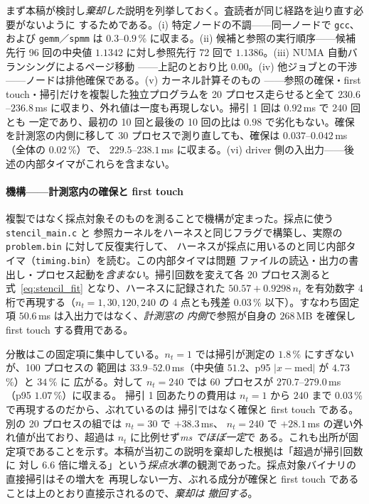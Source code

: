 \documentclass[conference,letterpaper]{IEEEtran}
\begin{document}
まず本稿が検討し\emph{棄却した}説明を列挙しておく。査読者が同じ経路を辿り直す必要がないように
するためである。(i) 特定ノードの不調——同一ノードで \texttt{gcc}、および
\texttt{gemm}／\texttt{spmm} は $0.3$--$0.9$\,\% に収まる。(ii) 候補と参照の実行順序——候補先行
96 回の中央値 $1.1342$ に対し参照先行 72 回で $1.1386$。(iii) NUMA 自動バランシングによるページ移動
——上記のとおり比 $0.00$。(iv) 他ジョブとの干渉——ノードは排他確保である。(v) カーネル計算そのもの
——参照の確保・first touch・掃引だけを複製した独立プログラムを 20 プロセス走らせると全て
$230.6$--$236.8$\,ms に収まり、外れ値は一度も再現しない。掃引 1 回は $0.92$\,ms で 240 回とも
一定であり、最初の 10 回と最後の 10 回の比は $0.98$ で劣化もない。確保を計測窓の内側に移して
30 プロセスで測り直しても、確保は $0.037$--$0.042$\,ms（全体の $0.02$\,\%）で、
$229.5$--$238.1$\,ms に収まる。(vi) driver 側の入出力——後述の内部タイマがこれらを含まない。

\paragraph*{機構——計測窓内の確保と first touch}
複製ではなく採点対象そのものを測ることで機構が定まった。採点に使う \texttt{stencil\_main.c} と
参照カーネルをハーネスと同じフラグで構築し、実際の \texttt{problem.bin} に対して反復実行して、
ハーネスが採点に用いるのと同じ内部タイマ（\texttt{timing.bin}）を読む。この内部タイマは問題
ファイルの読込・出力の書出し・プロセス起動を\emph{含まない}。掃引回数を変えて各 20 プロセス測ると
式~\eqref{eq:stencil_fit} となり、ハーネスに記録された $50.57 + 0.9298\,n_t$ を有効数字 4 桁で再現する（$n_t=1,30,120,240$
の 4 点とも残差 $0.03$\,\% 以下）。すなわち固定項 $50.6$\,ms は入出力ではなく、\emph{計測窓の
内側}で参照が自身の $268$\,MB を確保し first touch する費用である。

分散はこの固定項に集中している。$n_t=1$ では掃引が測定の $1.8$\,\% にすぎないが、100 プロセスの
範囲は $33.9$--$52.0$\,ms（中央値 $51.2$、p95 $|x-\mathrm{med}|$ が $4.73$\,\%）と $34$\,\% に
広がる。対して $n_t=240$ では 60 プロセスが $270.7$--$279.0$\,ms（p95 $1.07$\,\%）に収まる。
掃引 1 回あたりの費用は $n_t=1$ から $240$ まで $0.03$\,\% で再現するのだから、ぶれているのは
掃引ではなく確保と first touch である。別の 20 プロセスの組では $n_t=30$ で $+38.3$\,ms、
$n_t=240$ で $+28.1$\,ms の遅い外れ値が出ており、超過は $n_t$ に比例せず\emph{ms でほぼ一定}で
ある。これも出所が固定項であることを示す。本稿が当初この説明を棄却した根拠は「超過が掃引回数に
対し $6.6$ 倍に増える」という\emph{採点水準}の観測であった。採点対象バイナリの直接掃引はその増大を
再現しない一方、ぶれる成分が確保と first touch であることは上のとおり直接示されるので、\emph{棄却は
撤回する}。
\end{document}
